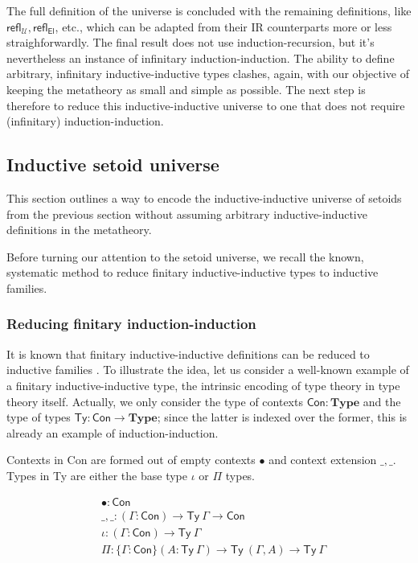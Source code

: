 \documentclass{easychair}
\newcommand{\GG}{\Gamma}
\newcommand{\setoidU}{\mathcal{U}}
\newcommand{\mType}{\mathbf{Type}}
\newcommand{\El}{\textsf{El}}
\newcommand{\reflu}{\textsf{refl}_\setoidU}
\newcommand{\reflel}{\textsf{refl}_\El}
\begin{document}
The full definition of the universe is concluded with the remaining definitions,
like $\reflu, \reflel$, etc., which can be adapted from their IR counterparts
more or less straighforwardly. The final result does not use
induction-recursion, but it's nevertheless an instance of infinitary
induction-induction. The ability to define arbitrary, infinitary
inductive-inductive types clashes, again, with our objective of keeping the
metatheory as small and simple as possible. The next step is therefore to reduce
this inductive-inductive universe to one that does not require (infinitary)
induction-induction.

\subsection{Inductive setoid universe}

This section outlines a way to encode the inductive-inductive universe of
setoids from the previous section without assuming arbitrary inductive-inductive
definitions in the metatheory.

Before turning our attention to the setoid universe, we recall the known,
systematic method to reduce finitary inductive-inductive types to inductive
families.

\subsubsection{Reducing finitary induction-induction}

It is known that finitary inductive-inductive definitions can be reduced to
inductive families \cite{iit-erasure,iit-to-ix,induction-is-enough}.
%
To illustrate the idea, let us consider a well-known example of a finitary
inductive-inductive type, the intrinsic encoding of type theory in type theory
itself. Actually, we only consider the type of contexts $\textsf{Con} :
\mType$ and the type of types $\textsf{Ty} : \textsf{Con} \to \mType$; since the
latter is indexed over the former, this is already an example of
induction-induction.

Contexts in \textsf{Con} are formed out of empty contexts $\bullet$ and context
extension $\_,\_$. Types in \textsf{Ty} are either the base type $\iota$ or
$\Pi$ types.

\begin{align*}
  & \bullet : \textsf{Con} \\
  & \_,\_ : (\GG : \textsf{Con}) \to \textsf{Ty}\ \GG \to \textsf{Con} \\
  & \iota : (\GG : \textsf{Con}) \to \textsf{Ty}\ \GG \\
  & \Pi : \{\GG : \textsf{Con}\} (A : \textsf{Ty}\ \GG) \to \textsf{Ty}\ (\GG , A) \to \textsf{Ty}\ \GG
\end{align*}
\end{document}
